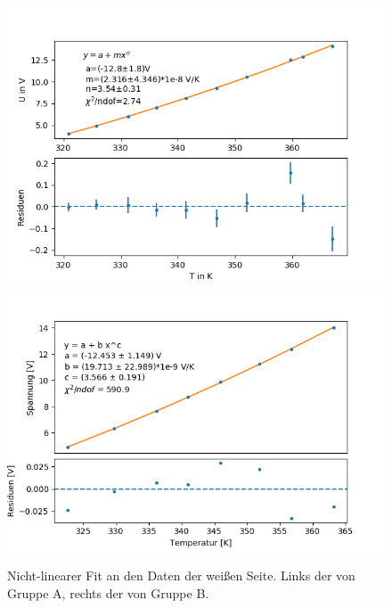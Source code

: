 \documentclass[12pt,a4paper]{article}
\begin{document}
\begin{figure}[H]
\centering
\includegraphics[scale=0.5]{Bilder/nichtlinear_A_weiss.png}
\includegraphics[scale=0.5]{Bilder/nonlinear_weiss_B.png}
\caption{Nicht-linearer Fit an den Daten der weißen Seite. Links der von Gruppe A, rechts der von Gruppe B.}
\end{figure}
\end{document}
